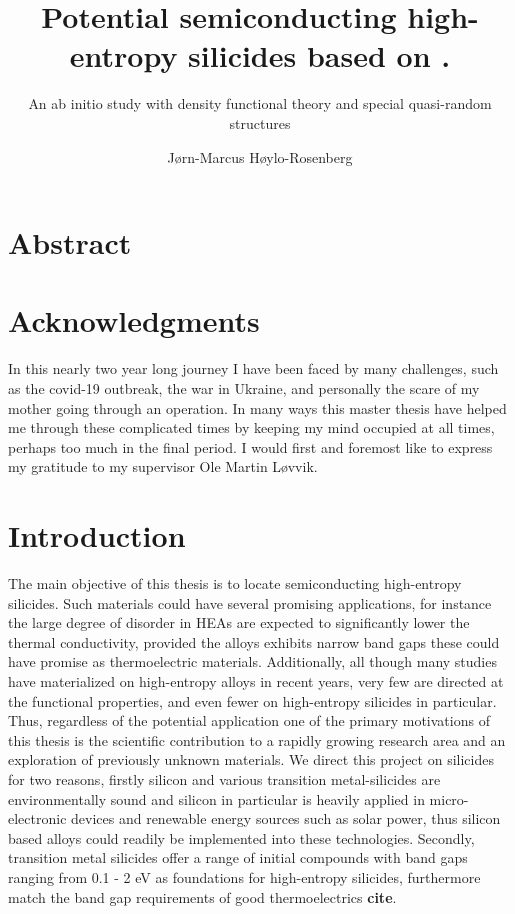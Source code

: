\documentclass[UKenglish]{ifimaster}  %
\title{Potential semiconducting high-entropy silicides based on \ch{FeSi2}.}        %
\subtitle{An ab initio study with density functional theory and special quasi-random structures}         %
\author{Jørn-Marcus Høylo-Rosenberg}                      %
\begin{document}
\duoforside[dept={Department of Chemistry},   %
  program={Materials Science for Energy and Nanotechnology},  %
  long]                                        %

\frontmatter{}  

\chapter*{Abstract}                   %

\tableofcontents{}
\listoffigures{}
\listoftables{}

\chapter*{Acknowledgments}                    %
In this nearly two year long journey I have been faced by many challenges, such as the covid-19 outbreak, the war in Ukraine, and personally the scare of my mother going through an operation. In many ways this master thesis have helped me through these complicated times by keeping my mind occupied at all times, perhaps too much in the final period. I would first and foremost like to express my gratitude to my supervisor Ole Martin Løvvik.   

\mainmatter{}

\chapter{Introduction}                  %

The main objective of this thesis is to locate semiconducting high-entropy silicides. Such materials could have several promising applications, for instance the large degree of disorder in HEAs are expected to significantly lower the thermal conductivity, provided the alloys exhibits narrow band gaps these could have promise as thermoelectric materials. Additionally, all though many studies have materialized on high-entropy alloys in recent years, very few are directed at the functional properties, and even fewer on high-entropy silicides in particular. Thus, regardless of the potential application one of the primary motivations of this thesis is the scientific contribution to a rapidly growing research area and an exploration of previously unknown materials. We direct this project on silicides for two reasons, firstly silicon and various transition metal-silicides are environmentally sound and silicon in particular is heavily applied in micro-electronic devices and renewable energy sources such as solar power, thus silicon based alloys could readily be implemented into these technologies. Secondly, transition metal silicides offer a range of initial compounds with band gaps ranging from 0.1 - 2 eV as foundations for high-entropy silicides, furthermore match the band gap requirements of good thermoelectrics \textbf{cite}. 
\end{document}

